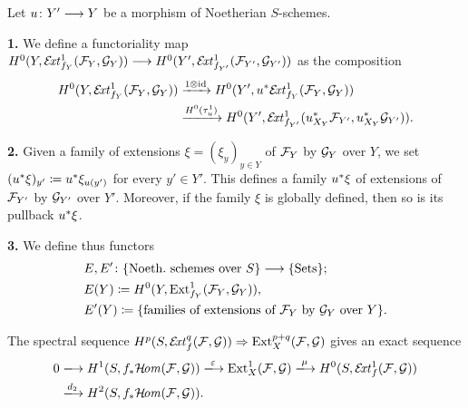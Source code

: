 \begin{definition} 
	Let $u\colon Y'\longrightarrow Y$ be a morphism of Noetherian $S$-schemes.

	\textbf{1.} We define a functoriality map
	$H^0(Y,\mathcal{E}\!\mathit{xt}^1_{f_Y}(\mathcal{F}_Y,\mathcal{G}_Y))
	\longrightarrow
	H^0(Y',\mathcal{E}\!\mathit{xt}^1_{f_{Y'}}(\mathcal{F}_{Y'},\mathcal{G}_{Y'}))
	$
	as the composition
	\begin{align*}
		H^0(Y,\mathcal{E}\!\mathit{xt}^1_{f_Y}(\mathcal{F}_Y,\mathcal{G}_Y)) &
		\xrightarrow{1\otimes \operatorname{id}} 
		H^0(Y',u^{*}\mathcal{E}\!\mathit{xt}^1_{f_Y}(\mathcal{F}_Y,\mathcal{G}_Y)) \\
		& \xrightarrow{H^0(\tau^1_u)} 
		H^0(Y',\mathcal{E}\!\mathit{xt}^1_{f_{Y'}}(u_{X_Y}^{*}\mathcal{F}_{Y'},u_{X_Y}^{*}\mathcal{G}_{Y'})).
	\end{align*}

	\textbf{2.} Given a family of extensions $\xi = (\xi_y)_{y\in Y}$ of $\mathcal{F}_Y$ by $\mathcal{G}_Y$ over $Y$, we set $(u^{*}\xi)_{y'} \coloneqq u^{*}\xi_{u(y')}$ for every $y' \in Y'$. This defines a family $u^{*}\xi$ of extensions of $\mathcal{F}_{Y'}$ by $\mathcal{G}_{Y'}$ over $Y'$. Moreover, if the family $\xi$ is globally defined, then so is its pullback $u^{*}\xi$.

	\textbf{3.} We define thus functors
	\begin{align*}
		& E,E' \colon \{\text{Noeth.\ schemes over } S\} \longrightarrow \{\text{Sets}\}; \\
		& E(Y) \coloneqq H^0(Y,\operatorname{Ext}^1_{f_Y}(\mathcal{F}_Y,\mathcal{G}_Y)), \\
		& E'(Y) \coloneqq \{\text{families of extensions of $\mathcal{F}_Y$ by $\mathcal{G}_Y$ over } Y\}. \\
	\end{align*}

\end{definition}

\begin{remark}
	The spectral sequence $H^p(S,\mathcal{E}\!\mathit{xt}^q_f(\mathcal{F},\mathcal{G})) \Rightarrow \operatorname{Ext}^{p+q}_X(\mathcal{F},\mathcal{G})$ gives an exact sequence
	\begin{align*}
		0
		& \xlongrightarrow{} H^1(S,\pushf{f}\HOM(\mc{F},\mc{G}))
		 \xlongrightarrow{\varepsilon} \Ext^1_X(\mc{F},\mc{G})
		 \xlongrightarrow{\mu} H^0(S,\EXT^1_f(\mc{F},\mc{G})) \\
		& \xlongrightarrow{d_2} H^2(S,\pushf{f}\HOM(\mc{F},\mc{G})).
	\end{align*}
\end{remark}


